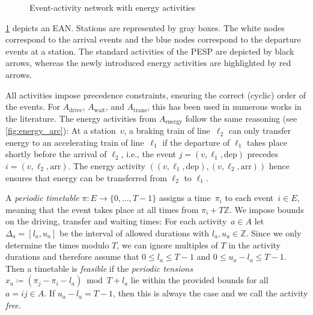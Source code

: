 \documentclass[11pt,a4paper]{article}
\newcommand{\arr}{\mathrm{arr}}
\newcommand{\dep}{\mathrm{dep}}
\newcommand{\drive}{\mathrm{drive}}
\newcommand{\wait}{\mathrm{wait}}
\newcommand{\transfer}{\mathrm{trans}}
\newcommand{\energy}{\mathrm{energy}}
\newcommand{\possenergyact}{A_{\energy}} %
\newcommand{\Z}{\mathbb Z}
\theoremstyle{definition}
\theoremstyle{remark}
\begin{document}
\begin{figure}
     \caption{Event-activity network with energy activities}
    \label{fig:EAN}
\end{figure}

\cref{fig:EAN} depicts an EAN. Stations are represented by gray boxes. The white nodes correspond to the arrival events and the blue nodes correspond to the departure events at a station. The standard activities of the PESP are depicted by black arrows, whereas the newly introduced energy activities are highlighted by red arrows.

All activities impose precedence constraints, ensuring the correct (cyclic) order of the events. For $A_\drive$, $A_\wait$, and $A_\transfer$, this has been used in numerous works in the literature. The energy activities from $\possenergyact$ follow the same reasoning (see \cref{fig:energy_arc}): At a station~$v$, a braking train of line~$\ell_2$ can only transfer energy to an accelerating train of line~$\ell_1$ if the departure of $\ell_1$ takes place shortly before the arrival of $\ell_2$, i.e., the event $j = (v, \ell_1, \dep)$ precedes $i = (v,\ell_2,\arr)$. The energy activity $((v,\ell_1,\dep), (v,\ell_2,\arr))$ hence ensures that energy can be transferred from $\ell_2$ to $\ell_1$.

A \emph{periodic timetable} $\pi \colon E \to \{0,\dotsc,T-1\}$ assigns a time~$\pi_i$ to each event~$i \in E$, meaning that the event takes place at all times from $\pi_i + T\Z$. We impose bounds on the driving, transfer and waiting times: For each activity~$a \in A$ let $\Delta_a  = [l_a, u_a]$ be the interval of allowed durations with $l_a, u_a \in \Z$. Since we only determine the times modulo $T$, we can ignore multiples of $T$ in the activity durations and therefore assume that $0 \leq l_a \leq T-1$ and $0 \leq u_a - l_a \leq  T - 1$. Then a timetable is \emph{feasible} if the \emph{periodic tensions} $x_{a} \coloneqq (\pi_j - \pi_i - l_{a}) \bmod T + l_{a}$ lie within the provided bounds for all $a = ij \in A$. If $u_a - l_a = T-1$, then this is always the case and we call the activity \emph{free}.
\end{document}
